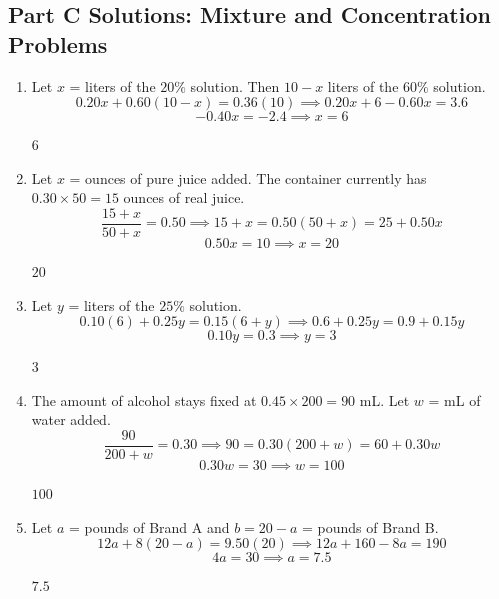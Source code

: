 \documentclass[14pt]{extarticle}
\begin{document}
\subsection*{Part C Solutions: Mixture and Concentration Problems}
\begin{enumerate}
  \item Let \(x\) = liters of the \(20\%\) solution. Then \(10 - x\) liters of the \(60\%\) solution.
  \[
  0.20x + 0.60(10 - x) = 0.36(10) \implies 0.20x + 6 - 0.60x = 3.6
  \]
  \[
  -0.40x = -2.4 \implies x = 6
  \]

  \(\boxed{6}\)

  \item Let \(x\) = ounces of pure juice added. The container currently has \(0.30 \times 50 = 15\) ounces of real juice.
  \[
  \frac{15 + x}{50 + x} = 0.50 \implies 15 + x = 0.50(50 + x) = 25 + 0.50x
  \]
  \[
  0.50x = 10 \implies x = 20
  \]

  \(\boxed{20}\)

  \item Let \(y\) = liters of the \(25\%\) solution.
  \[
  0.10(6) + 0.25y = 0.15(6 + y) \implies 0.6 + 0.25y = 0.9 + 0.15y
  \]
  \[
  0.10y = 0.3 \implies y = 3
  \]

  \(\boxed{3}\)

  \item The amount of alcohol stays fixed at \(0.45 \times 200 = 90\) mL. Let \(w\) = mL of water added.
  \[
  \frac{90}{200 + w} = 0.30 \implies 90 = 0.30(200 + w) = 60 + 0.30w
  \]
  \[
  0.30w = 30 \implies w = 100
  \]

  \(\boxed{100}\)

  \item Let \(a\) = pounds of Brand A and \(b = 20 - a\) = pounds of Brand B.
  \[
  12a + 8(20 - a) = 9.50(20) \implies 12a + 160 - 8a = 190
  \]
  \[
  4a = 30 \implies a = 7.5
  \]

  \(\boxed{7.5}\)
\end{enumerate}
\end{document}
